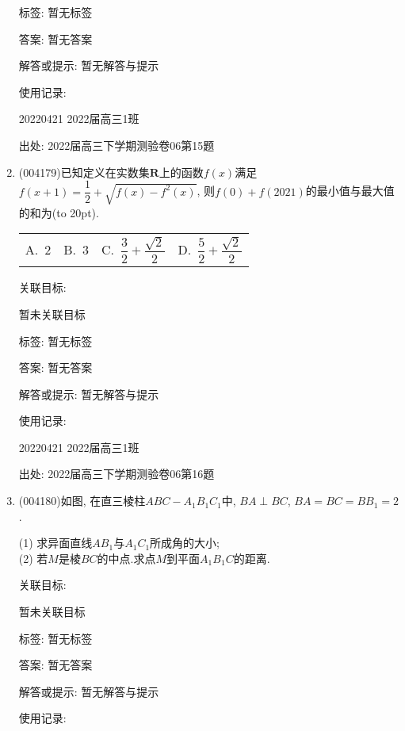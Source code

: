 \documentclass[10pt,a4paper]{article}
\newcommand{\bracket}[1]{(\hbox to #1pt{})}
\newcommand{\fourch}[4]{\par\begin{tabular}{p{.23\textwidth}p{.23\textwidth}p{.23\textwidth}p{.23\textwidth}}
A.~#1 &B.~#2& C.~#3& D.~#4
\end{tabular}}
\begin{document}
\begin{enumerate}[1.]
标签: 暂无标签

答案: 暂无答案

解答或提示: 暂无解答与提示

使用记录:

20220421	2022届高三1班	


出处: 2022届高三下学期测验卷06第15题
\item { (004179)}已知定义在实数集$\mathbf{R}$上的函数$f(x)$满足$f(x+1)=\dfrac 12+\sqrt{f(x)-f^2(x)}$, 则$f(0)+f(2021)$的最小值与最大值的和为\bracket{20}.
\fourch{$2$}{$3$}{$\dfrac 32+\dfrac{\sqrt 2}2$}{$\dfrac 52+\dfrac{\sqrt 2}2$}


关联目标:

暂未关联目标



标签: 暂无标签

答案: 暂无答案

解答或提示: 暂无解答与提示

使用记录:

20220421	2022届高三1班	


出处: 2022届高三下学期测验卷06第16题
\item { (004180)}如图, 在直三棱柱$ABC-A_1B_1C_1$中, $BA\perp BC$, $BA=BC=BB_1=2$.
\begin{center}
\end{center}
(1) 求异面直线$AB_1$与$A_1C_1$所成角的大小;\\
(2) 若$M$是棱$BC$的中点.求点$M$到平面$A_1{B_1}C$的距离.


关联目标:

暂未关联目标



标签: 暂无标签

答案: 暂无答案

解答或提示: 暂无解答与提示

使用记录:


\end{enumerate}
\end{document}
